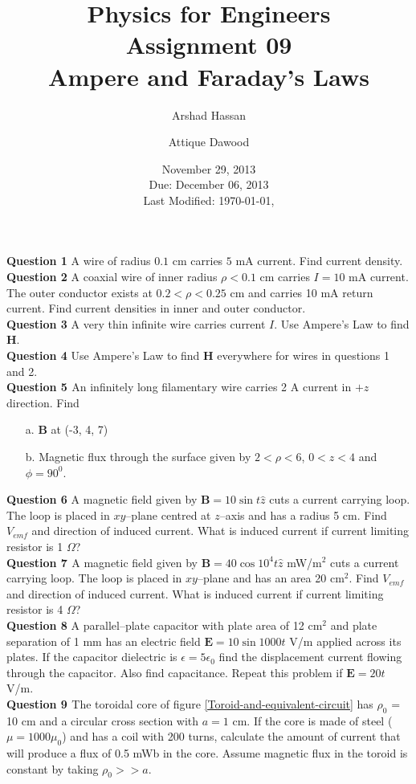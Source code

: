 \documentclass[12pt,a4paper]{article}
\title{\vspace{-3cm}Physics for Engineers\\Assignment 09\\Ampere and Faraday's Laws}
\author{Arshad Hassan\and Attique Dawood}
\date{November 29, 2013\\Due: December 06, 2013\\[0.2cm] Last Modified: \today, \currenttime}
\begin{document}
\maketitle
\noindent\textbf{Question 1} A wire of radius $0.1$ cm carries $5$ mA current. Find current density.\\[0.2cm]
\noindent\textbf{Question 2} A coaxial wire of inner radius $\rho<0.1$ cm carries $I=10$ mA current. The outer conductor exists at $0.2<\rho<0.25$ cm and carries 10 mA return current. Find current densities in inner and outer conductor.\\[0.2cm]
\noindent\textbf{Question 3} A very thin infinite wire carries current $I$. Use Ampere's Law to find \textbf{H}.\\[0.2cm]
\noindent\textbf{Question 4} Use Ampere's Law to find \textbf{H} everywhere for wires in questions 1 and 2.\\[0.2cm]
\noindent\textbf{Question 5 \cite[Problem 7.21, page 300]{Sadiku}} An infinitely long filamentary wire carries 2 A current in $+z$ direction. Find
\begin{itemize}
\item[a.] \textbf{B} at (-3, 4, 7)
\item[b.] Magnetic flux through the surface given by $2<\rho<6$, $0<z<4$ and $\phi=90^0$.
\end{itemize}
\noindent\textbf{Question 6} A magnetic field given by $\textbf{B}=10\sin t\hat z$ cuts a current carrying loop. The loop is placed in $xy$--plane centred at $z$--axis and has a radius 5 cm. Find $V_{emf}$ and direction of induced current. What is induced current if current limiting resistor is 1 $\Omega$?\\[0.2cm]
\noindent\textbf{Question 7 \cite[Problem 9.4, page 404]{Sadiku}} A magnetic field given by $\textbf{B}=40\cos 10^4 t\hat z$ mW/m$^2$ cuts a current carrying loop. The loop is placed in $xy$--plane and has an area 20 cm$^2$. Find $V_{emf}$ and direction of induced current. What is induced current if current limiting resistor is 4 $\Omega$?\\[0.2cm]
\noindent\textbf{Question 8} A parallel--plate capacitor with plate area of 12 cm$^2$ and plate separation of 1 mm has an electric field $\textbf{E}=10\sin 1000t$ V/m applied across its plates. If the capacitor dielectric is $\epsilon=5\epsilon_0$ find the displacement current flowing through the capacitor. Also find capacitance. Repeat this problem if $\textbf{E}=20t$ V/m.\\[0.2cm]
\noindent\textbf{Question 9 \cite[Example 8.14, page 350]{Sadiku}} The toroidal core of figure \ref{Toroid-and-equivalent-circuit} has $\rho_0$ = 10 cm and a circular cross section with $a=1$ cm. If the core is made of steel ($\mu = 1000\mu_0$) and has a coil with 200 turns, calculate the amount of current that will produce a flux of 0.5 mWb in the core. Assume magnetic flux in the toroid is constant by taking $\rho_0>>a$.\\
\end{document}
